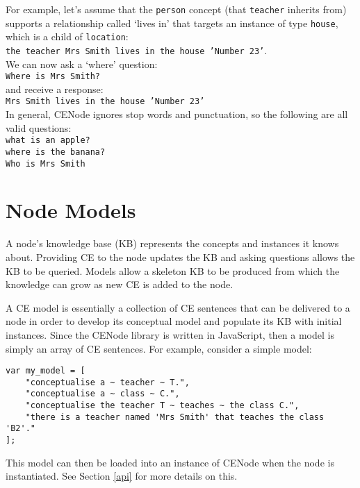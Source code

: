 \documentclass{scrartcl}
\begin{document}
For example, let's assume that the \texttt{person} concept (that \texttt{teacher} inherits from) supports a relationship called `lives in' that targets an instance of type \texttt{house}, which is a child of \texttt{location}:\\
\texttt{the teacher Mrs Smith lives in the house 'Number 23'}.\\

We can now ask a `where' question:\\
\texttt{Where is Mrs Smith?}\\
and receive a response:\\
\texttt{Mrs Smith lives in the house 'Number 23'}\\

In general, CENode ignores stop words and punctuation, so the following are all valid questions:\\
\texttt{what is an apple?}\\
\texttt{where is the banana?}\\
\texttt{Who is Mrs Smith}


\section{Node Models}
\label{models}
A node's knowledge base (KB) represents the concepts and instances it knows about. Providing CE to the node updates the KB and asking questions allows the KB to be queried. Models allow a skeleton KB to be produced from which the knowledge can grow as new CE is added to the node.

A CE model is essentially a collection of CE sentences that can be delivered to a node in order to develop its conceptual model and populate its KB with initial instances. Since the CENode library is written in JavaScript, then a model is simply an array of CE sentences. For example, consider a simple model:\\

\begin{samepage}
\begin{verbatim}
var my_model = [
    "conceptualise a ~ teacher ~ T.",
    "conceptualise a ~ class ~ C.",
    "conceptualise the teacher T ~ teaches ~ the class C.",
    "there is a teacher named 'Mrs Smith' that teaches the class 'B2'."
];
\end{verbatim}
\end{samepage}

This model can then be loaded into an instance of CENode when the node is instantiated. See Section \ref{api} for more details on this.\\
\end{document}
